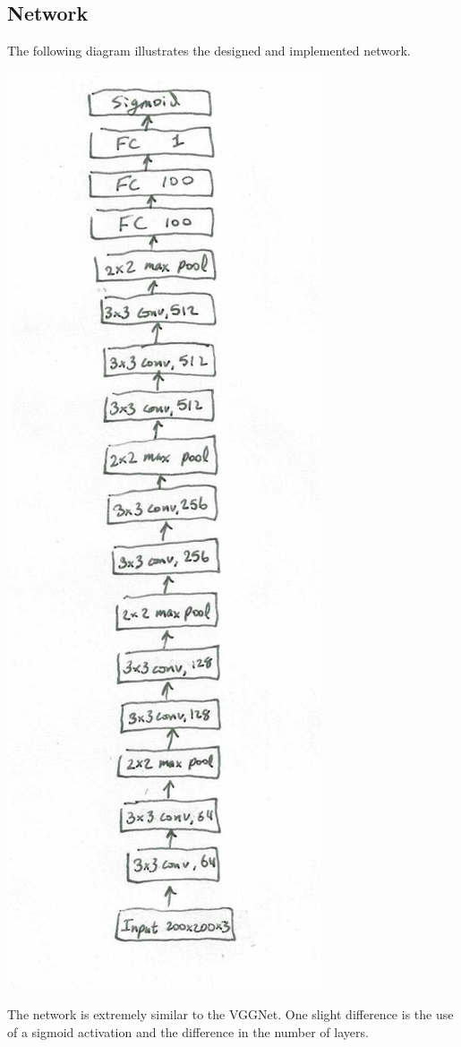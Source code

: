 \documentclass[ 12pt ]{article}
\begin{document}
\subsection*{Network}

The following diagram illustrates the designed and implemented network.
\begin{center}
	\includegraphics{Capture}
\end{center}
The network is extremely similar to the VGGNet. One slight difference is the use of a sigmoid activation and the difference in the number of layers.
\end{document}
